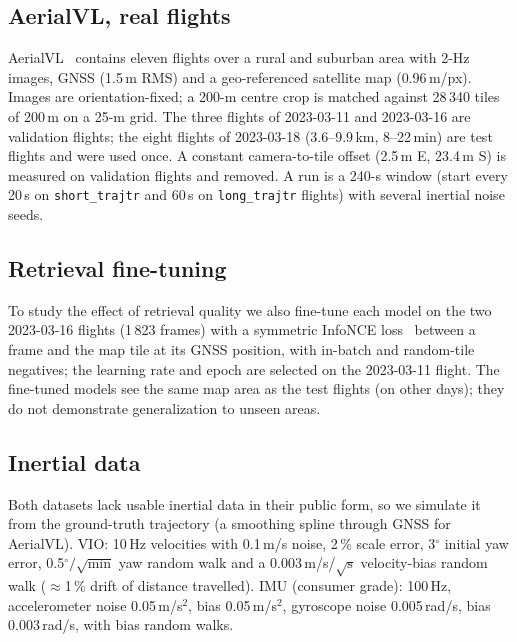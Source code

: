 \documentclass[journal]{IEEEtran}
\begin{document}
\subsection{AerialVL, real flights}
AerialVL~\cite{he2024aerialvl} contains eleven flights over a rural and suburban area with 2-Hz images, GNSS (1.5\,m RMS)
and a geo-referenced satellite map (0.96\,m/px). Images are orientation-fixed; a 200-m centre crop is matched against
28\,340 tiles of 200\,m on a 25-m grid. The three flights of 2023-03-11 and 2023-03-16 are validation flights; the eight
flights of 2023-03-18 (3.6--9.9\,km, 8--22\,min) are test flights and were used once. A constant camera-to-tile offset
(2.5\,m E, 23.4\,m S) is measured on validation flights and removed. A run is a 240-s window (start every 20\,s on
\texttt{short\_trajtr} and 60\,s on \texttt{long\_trajtr} flights) with several inertial noise seeds.

\subsection{Retrieval fine-tuning}\label{sec:ft}
To study the effect of retrieval quality we also fine-tune each model on the two 2023-03-16 flights (1\,823 frames)
with a symmetric InfoNCE loss~\cite{oord2018infonce} between a frame and the map tile at its GNSS position, with in-batch
and random-tile negatives; the learning rate and epoch are selected on the 2023-03-11 flight. The fine-tuned models see
the same map area as the test flights (on other days); they do not demonstrate generalization to unseen areas.

\subsection{Inertial data}
Both datasets lack usable inertial data in their public form, so we simulate it from the ground-truth trajectory (a
smoothing spline through GNSS for AerialVL). VIO: 10\,Hz velocities with 0.1\,m/s noise, 2\,\% scale error, 3$^\circ$
initial yaw error, 0.5$^\circ/\sqrt{\text{min}}$ yaw random walk and a 0.003\,m/s/$\sqrt{\text{s}}$ velocity-bias random
walk ($\approx$1\,\% drift of distance travelled). IMU (consumer grade): 100\,Hz, accelerometer noise 0.05\,m/s$^2$,
bias 0.05\,m/s$^2$, gyroscope noise 0.005\,rad/s, bias 0.003\,rad/s, with bias random walks.
\end{document}
